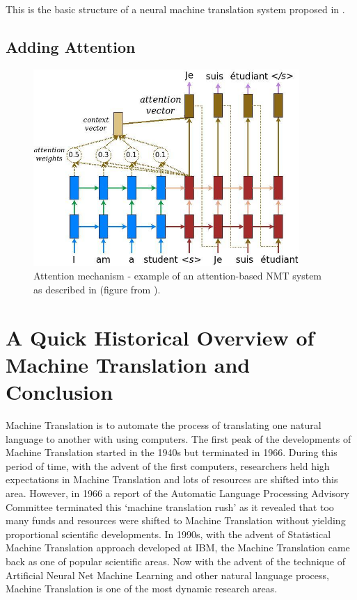 \documentclass[final]{ua-thesis}
\numberwithin{equation}{section}
\begin{document}
This is the basic structure of a neural machine translation system proposed in \citet{cho2014learning,cho2014properties}. 



\subsection{Adding Attention}
\begin{figure}[h]
\caption{Attention mechanism - example of an attention-based NMT system as described in \citet{luong2015effective} (figure from \citet{luong17GitHub}).}
\centering
\includegraphics[width=0.9\textwidth]{attention_mechanism.jpg}
\end{figure} 



\section{A Quick Historical Overview of Machine Translation and Conclusion}

Machine Translation is to automate the process of translating one natural language to another with using computers. The first peak of the developments of Machine Translation started in the 1940s but terminated in 1966. During this period of time, with the advent of the first computers, researchers held high expectations in Machine Translation and lots of resources are shifted into this area. However, in 1966 a report of the Automatic Language Processing Advisory Committee \citep{pierce1966language} terminated this `machine translation rush' as it revealed that too many funds and resources were shifted to Machine Translation without yielding proportional scientific developments. In 1990s, with the advent of Statistical Machine Translation approach developed at IBM, the Machine Translation came back as one of popular scientific areas. Now with the advent of the technique of Artificial Neural Net Machine Learning and other natural language process, Machine Translation is one of the most dynamic research areas.    
\end{document}
